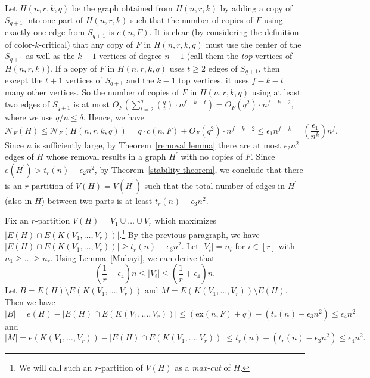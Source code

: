 \documentclass[10pt]{article}
\def\ex{\mathrm{ex}}
\begin{document}
Let $H(n,r,k,q)$ be the graph obtained from $H(n,r,k)$ by adding a copy of $S_{q+1}$ into one part of $H(n,r,k)$ such that the number of copies of $F$ using exactly one edge from $S_{q+1}$ is $c(n,F)$.
It is clear (by considering the definition of color-$k$-critical) that any copy of $F$ in $H(n,r,k,q)$ must use the center of the $S_{q+1}$ as well as the $k-1$ vertices of degree $n-1$ (call them the {\it top} vertices of $H(n,r,k)$).
If a copy of $F$ in $H(n,r,k,q)$ uses $t\geq 2$ edges of $S_{q+1}$, then except the $t+1$ vertices of $S_{q+1}$ and the $k-1$ top vertices, it uses $f-k-t$ many other vertices.
So the number of copies of $F$ in $H(n,r,k,q)$ using at least two edges of $S_{q+1}$ is at most $O_F\left(\sum_{t=2}^q \binom{q}{t}\cdot n^{f-k-t}\right)=O_F(q^2)\cdot n^{f-k-2}$, where we use $q/n\leq \delta$.
Hence, we have
\begin{equation}\label{low bound for H}
\mathcal{N}_F(H)\leq \mathcal{N}_F(H(n,r,k,q))=q\cdot c(n,F)+O_F(q^2)\cdot n^{f-k-2}\leq \epsilon_1 n^{f-k}=\left(\frac{\epsilon_1}{n^k}\right)n^f.
\end{equation}
Since $n$ is sufficiently large, by Theorem~\ref{removal lemma} there are at most $\epsilon_2 n^2$ edges of $H$ whose removal results in a graph $H^{\prime}$ with no copies of $F.$
Since $e(H^\prime)>t_r(n)-\epsilon_2n^2$, by Theorem~\ref{stability theorem},
we conclude that there is an $r$-partition of $V(H)=V(H^\prime)$ such that the total number of edges in $H^\prime$ (also in $H$) between two parts is at least $t_r(n)-\epsilon_3 n^2$.

Fix an $r$-partition $V(H)=V_1\cup\ldots\cup V_r$ which maximizes $|E(H)\cap E(K(V_1,\ldots,V_r))|$.\footnote{We will call such an $r$-partition of $V(H)$ as a {\it max-cut} of $H$.}
By the previous paragraph, we have $|E(H)\cap E(K(V_1,\ldots,V_r))|\geq t_r(n)-\epsilon_3 n^2$.
Let $|V_i|=n_i$ for $i\in [r]$ with $n_1\geq \ldots \geq n_r$.
Using Lemma~\ref{Mubayi}, we can derive that
\begin{equation}\label{v_i}
\left(\frac{1}{r}-\epsilon_4\right)n\leq|V_i|\leq\left(\frac{1}{r}+\epsilon_4\right)n.
\end{equation}
Let $B=E(H)\setminus E(K(V_1,\ldots,V_r))$ and $M=E(K(V_1,\ldots,V_r))\setminus E(H)$. Then we have
\begin{equation}\label{B}
|B|=e(H)-|E(H)\cap E(K(V_1,\ldots,V_r))|\leq (\ex(n,F)+q)-(t_r(n)-\epsilon_3 n^2)\leq \epsilon_4n^2
\end{equation}
and
\begin{equation}\label{M}
|M|=e(K(V_1,\ldots,V_r))-|E(H)\cap E(K(V_1,\ldots,V_r))|\leq t_r(n)-(t_r(n)-\epsilon_3 n^2)\leq\epsilon_4n^2.
\end{equation}
\end{document}

